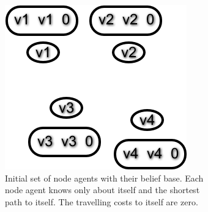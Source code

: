 \begin{figure}
  \centering
  \caption{Executing the Distance-Vector Routing Protocol algorithm as described in \autoref{alg:map_dv} on a small network of four nodes to calculate the shortest paths.
           Each node has a table attached, containing all accessible nodes.
           The first parameter is the destination node, the second one is the node to pass through and the third parameter shows the overall distance to the destination.
           For more compact display, we left out the parameter showing the cost of the edge to the next hop.\label{fig:dv}}
    \begin{subfigure}{.45\textwidth}
        \includegraphics[width=\textwidth] {images/dv0.png}
        \caption{Initial set of node agents with their belief base.
                 Each node agent knows only about itself and the shortest path to itself.
                 The travelling costs to itself are zero.}
    \end{subfigure}\quad
    \begin{subfigure}{.45\textwidth}

\end{subfigure}
\end{figure}
